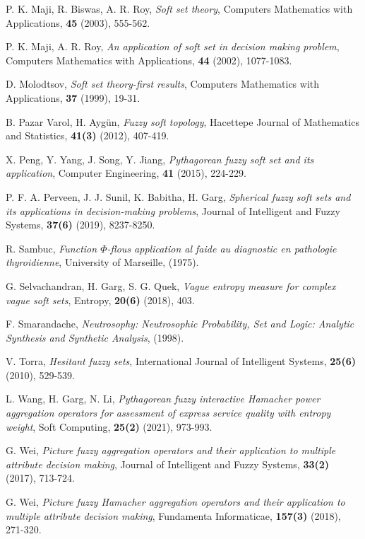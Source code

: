 \documentclass{IJFS}
\begin{document}
\begin{thebibliography}{1}
 P. K. Maji, R. Biswas, A. R. Roy, {\it Soft set theory}, Computers Mathematics
with Applications, {\bf 45} (2003), 555-562.

 P. K. Maji, A. R. Roy, {\it An application of soft set in decision making
problem}, Computers Mathematics with Applications, {\bf 44} (2002), 1077-1083.


 D. Molodtsov, {\it Soft set theory-first results}, Computers Mathematics
with Applications, {\bf 37} (1999), 19-31.



 B. Pazar Varol, H. Ayg\"{u}n, {\it Fuzzy soft topology}, Hacettepe Journal of
Mathematics and Statistics, {\bf 41(3)} (2012), 407-419.

 X. Peng, Y. Yang, J. Song, Y. Jiang, {\it Pythagorean fuzzy soft set and
its application}, Computer Engineering, {\bf 41} (2015), 224-229.


 P. F. A. Perveen, J. J. Sunil, K. Babitha, H. Garg,
{\it Spherical fuzzy soft sets and its applications in decision-making
problems}, Journal of Intelligent and Fuzzy Systems, {\bf 37(6)} (2019),
8237-8250.


 R. Sambuc, {\it Function $\Phi$-flous application al faide au diagnostic en pathologie
thyroidienne}, University of Marseille, (1975).

 G. Selvachandran, H. Garg, S. G. Quek, {\it Vague entropy measure for complex vague soft sets}, Entropy, {\bf 20(6)} (2018), 403.

 F. Smarandache, {\it Neutrosophy: Neutrosophic Probability, Set and Logic: Analytic
Synthesis and Synthetic Analysis}, (1998).

 V. Torra, {\it Hesitant fuzzy sets}, International Journal of Intelligent Systems, {\bf 25(6)} (2010), 529-539.

 L. Wang, H. Garg, N. Li, {\it Pythagorean fuzzy interactive Hamacher power aggregation operators for assessment of express service quality with entropy weight}, Soft Computing, {\bf 25(2)} (2021), 973-993.

 G. Wei, {\it Picture fuzzy aggregation operators and their application
to multiple attribute decision making}, Journal of Intelligent and
Fuzzy Systems, {\bf 33(2)} (2017), 713-724.

 G. Wei, {\it Picture fuzzy Hamacher aggregation operators and their
application to multiple attribute decision making}, Fundamenta
Informaticae, {\bf 157(3)} (2018), 271-320.


\end{thebibliography}
\end{document}
